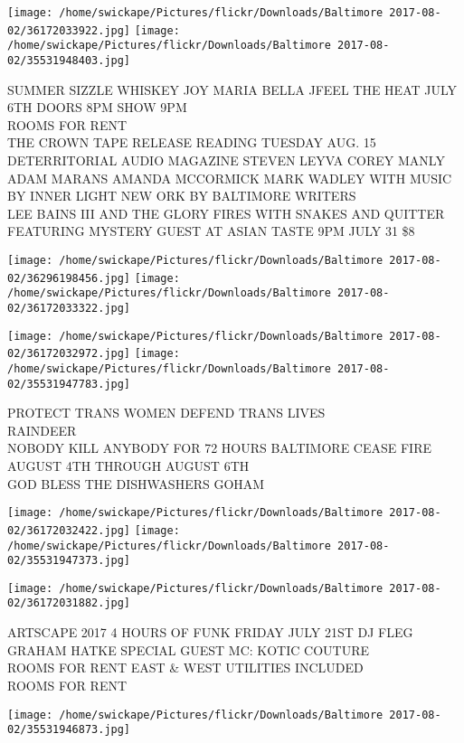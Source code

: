 \documentclass[10pt,letterpaper]{article}
\begin{document}
\texttt{[image: /home/swickape/Pictures/flickr/Downloads/Baltimore 2017-08-02/36172033922.jpg]}
\texttt{[image: /home/swickape/Pictures/flickr/Downloads/Baltimore 2017-08-02/35531948403.jpg]}

SUMMER SIZZLE WHISKEY JOY MARIA BELLA JFEEL THE HEAT JULY 6TH DOORS 8PM SHOW 9PM\\
ROOMS FOR RENT\\
THE CROWN TAPE RELEASE READING TUESDAY AUG. 15 DETERRITORIAL AUDIO MAGAZINE STEVEN LEYVA COREY MANLY ADAM MARANS AMANDA MCCORMICK MARK WADLEY WITH MUSIC BY INNER LIGHT NEW ORK BY BALTIMORE WRITERS\\
LEE BAINS III AND THE GLORY FIRES WITH SNAKES AND QUITTER FEATURING MYSTERY GUEST AT ASIAN TASTE 9PM JULY 31 \$8\\
\pagebreak

\texttt{[image: /home/swickape/Pictures/flickr/Downloads/Baltimore 2017-08-02/36296198456.jpg]}
\texttt{[image: /home/swickape/Pictures/flickr/Downloads/Baltimore 2017-08-02/36172033322.jpg]}

\texttt{[image: /home/swickape/Pictures/flickr/Downloads/Baltimore 2017-08-02/36172032972.jpg]}
\texttt{[image: /home/swickape/Pictures/flickr/Downloads/Baltimore 2017-08-02/35531947783.jpg]}

PROTECT TRANS WOMEN DEFEND TRANS LIVES\\
RAINDEER\\
NOBODY KILL ANYBODY FOR 72 HOURS BALTIMORE CEASE FIRE AUGUST 4TH THROUGH AUGUST 6TH\\
GOD BLESS THE DISHWASHERS GOHAM\\
\pagebreak

\texttt{[image: /home/swickape/Pictures/flickr/Downloads/Baltimore 2017-08-02/36172032422.jpg]}
\texttt{[image: /home/swickape/Pictures/flickr/Downloads/Baltimore 2017-08-02/35531947373.jpg]}

\texttt{[image: /home/swickape/Pictures/flickr/Downloads/Baltimore 2017-08-02/36172031882.jpg]}

ARTSCAPE 2017 4 HOURS OF FUNK FRIDAY JULY 21ST DJ FLEG GRAHAM HATKE SPECIAL GUEST MC: KOTIC COUTURE\\
ROOMS FOR RENT EAST \& WEST UTILITIES INCLUDED\\
ROOMS FOR RENT\\
\pagebreak

\texttt{[image: /home/swickape/Pictures/flickr/Downloads/Baltimore 2017-08-02/35531946873.jpg]}
\end{document}

